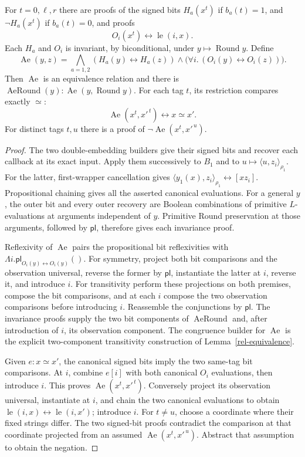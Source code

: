 \begin{lemma}
\label{rel-tags}
For \(t=0,\ell,r\) there are proofs of the signed bits
\(H_a(x^t)\) if \(b_a(t)=1\), and \(\neg H_a(x^t)\) if
\(b_a(t)=0\), and proofs
\[
 O_i(x^t)\leftrightarrow \operatorname{le}(i,x).
\]
Each \(H_a\) and \(O_i\) is invariant, by biconditional, under
\(y\mapsto\operatorname{Round}y\).
Define
\[
 \operatorname{Ae}(y,z)=
   \bigwedge_{a=1,2}(H_a(y)\leftrightarrow H_a(z))
    \land\bigl(\forall i.\,(O_i(y)\leftrightarrow O_i(z))\bigr).
\]
Then \(\operatorname{Ae}\) is an equivalence relation and
there is \(\operatorname{AeRound}(y):
\operatorname{Ae}(y,\operatorname{Round}y)\).
For each tag \(t\), its restriction compares exactly \(\simeq\):
\[
 \operatorname{Ae}(x^t,x'^{\,t})\leftrightarrow x\simeq x'.
\]
For distinct tags \(t,u\) there is a proof of
\(\neg\operatorname{Ae}(x^t,x'^{\,u})\).
\end{lemma}
\begin{proof}
The two double-embedding builders give their signed bits and
recover each callback at its exact input.  Apply them successively
to \(B_1\) and to \(u\mapsto\langle u,z_i\rangle_{\rho_1}\).
For the latter, first-wrapper cancellation gives
\(\langle y_1(x),z_i\rangle_{\rho_1}\leftrightarrow[xz_i]\).
Propositional chaining gives all the asserted canonical
evaluations.  For a general \(y\), the outer bit and every
outer recovery are Boolean combinations of primitive
\(L\)-evaluations at arguments independent of \(y\).
Primitive Round preservation at those arguments, followed
by \(\mathsf{pl}\), therefore gives each invariance proof.

Reflexivity of \(\operatorname{Ae}\) pairs the propositional
bit reflexivities with
\(\Lambda i.\mathsf{pl}_{O_i(y)\leftrightarrow O_i(y)}()\).
For symmetry, project both bit comparisons and the observation
universal, reverse the former by \(\mathsf{pl}\), instantiate
the latter at \(i\), reverse it, and introduce \(i\).
For transitivity perform these projections on both premises,
compose the bit comparisons, and at each \(i\) compose the
two observation comparisons before introducing \(i\).
Reassemble the conjunctions by \(\mathsf{pl}\).
The invariance proofs supply the two bit components of
\(\operatorname{AeRound}\) and, after introduction of \(i\),
its observation component.  The congruence builder for
\(\operatorname{Ae}\) is the explicit two-component
transitivity construction of Lemma~\ref{rel-equivalence}.

Given \(e:x\simeq x'\), the canonical signed bits imply
the two same-tag bit comparisons.  At \(i\), combine \(e[i]\)
with both canonical \(O_i\) evaluations, then introduce \(i\).
This proves \(\operatorname{Ae}(x^t,x'^{\,t})\).
Conversely project its observation universal, instantiate at
\(i\), and chain the two canonical evaluations to obtain
\(\operatorname{le}(i,x)\leftrightarrow \operatorname{le}(i,x')\); introduce \(i\).
For \(t\ne u\), choose a coordinate where their fixed strings
differ.  The two signed-bit proofs contradict the comparison
at that coordinate projected from an assumed
\(\operatorname{Ae}(x^t,x'^{\,u})\).
Abstract that assumption to obtain the negation.
\end{proof}

